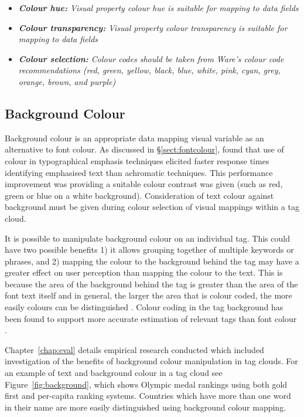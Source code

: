 \begin{itemize}
	\item \emph{\textbf{Colour hue:} Visual property colour hue is suitable for mapping to data fields}	
	\item \emph{\textbf{Colour transparency:} Visual property colour transparency is suitable for mapping to data fields}	
	\item \emph{\textbf{Colour selection:} Colour codes should be taken from Ware's  colour code recommendations (red, green, yellow, black, blue, white, pink, cyan, grey, orange, brown, and purple)}	
\end{itemize}

\subsection{Background Colour}\label{sect:backgroundcolour}

Background colour is an appropriate data mapping visual variable as an alternative to font colour. As discussed in \S\ref{sect:fontcolour}, \citet{preston10} found that use of colour in typographical emphasis techniques elicited faster response times identifying emphasised text than achromatic techniques. This performance improvement was providing a suitable colour contrast was given (such as red, green or blue on a white background). Consideration of text colour against background must be given during colour selection of visual mappings within a tag cloud. 

It is possible to manipulate background colour on an individual tag. This could have two possible benefits 1) it allows grouping together of multiple keywords or phrases, and 2) mapping the colour to the background behind the tag may have a greater effect on user perception than mapping the colour to the text. This is because the area of the background behind the tag is greater than the area of the font text itself and in general, the larger the area that is colour coded, the more easily colours can be distinguished \citep[pg 125, chap 4][]{ware04}. Colour coding in the tag background has been found to support more accurate estimation of relevant tags than font colour \citep{waldner13}.

Chapter~\ref{chap:eval} details empirical research conducted which included investigation of the benefits of background colour manipulation in tag clouds. For an example of text and background colour in a tag cloud see Figure~\vref{fig:background}, which shows Olympic medal rankings using both gold first and per-capita ranking systems. Countries which have more than one word in their name are more easily distinguished using background colour mapping.

